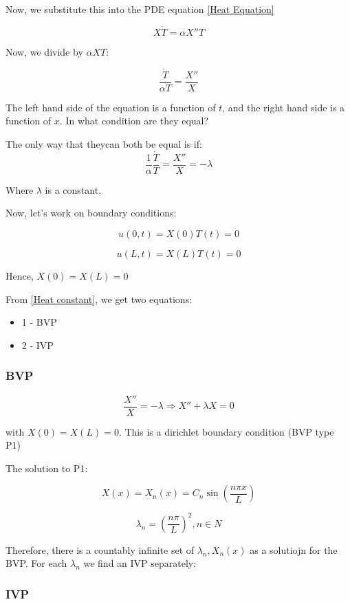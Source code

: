 Now, we substitute this into the PDE equation \ref{Heat Equation}

$$X \dot{T} = \alpha X'' T$$

Now, we divide by $\alpha XT$:

$$\frac{\dot{T}}{\alpha T} = \frac{X''}{X}$$

The left hand side of the equation is a function of $t$, and the right hand side is a function of $x$. In what condition are they equal?

The only way that theycan both be equal is if:
\begin{equation}
\label{Heat constant}
    \frac{1}{\alpha} \frac{\dot{T}}{T} = \frac{X''}{X} = - \lambda
\end{equation}


Where $\lambda$ is a constant. 

\hfill

Now, let's work on boundary conditions:

$$u(0,t) = X(0) T(t) = 0$$

$$u(L,t) = X(L) T(t) = 0$$


\begin{center}
    Hence, $X(0) = X(L) = 0$
\end{center}

From \ref{Heat constant}, we get two equations: 

\begin{itemize}
    \item 1 - BVP
    \item 2 - IVP
\end{itemize}

\subsubsection{BVP}

$$\frac{X''}{X} = -\lambda \Rightarrow X'' + \lambda X = 0$$

with $X(0) = X(L) = 0$. This is a dirichlet boundary condition (BVP type P1)

The solution to P1:

$$X(x) = X_n (x) = C_n \sin(\frac{n \pi x}{L})$$

$$\lambda_n = \left( \frac{n \pi}{L}\right)^2, n \in N$$

Therefore, there is a countably infinite set of $\lambda_n, X_n (x)$ as a solutiojn for the BVP. For each $\lambda_n$ we find an IVP separately:

\subsubsection{IVP}

